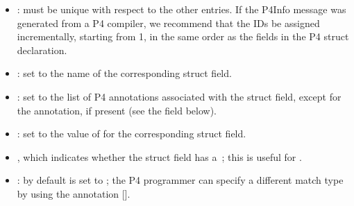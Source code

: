 \documentclass[11pt]{article}
\begin{document}
{\begin{enumerate}[,start=2]
\begin{itemize}[noitemsep,topsep=\mdcompacttopsep]%

\item{}: must be unique with respect to the other  entries. If the P4Info
message was generated from a P4 compiler, we recommend that the IDs be
assigned incrementally, starting from 1, in the same order as the fields in
the P4 struct declaration.%

\item{}: set to the name of the corresponding struct field.%

\item{}: set to the list of P4 annotations associated with the struct
field, except for the  annotation, if present (see the  field
below).%

\item{}: set to the value of  for the corresponding struct field.%

\item{}, which indicates whether the struct field has a~; this is useful for
.%

\item{}: by default  is set to ; the P4 programmer can
specify a different match type by using the  annotation
[].%


\end{itemize}
\end{enumerate}}
\end{document}
